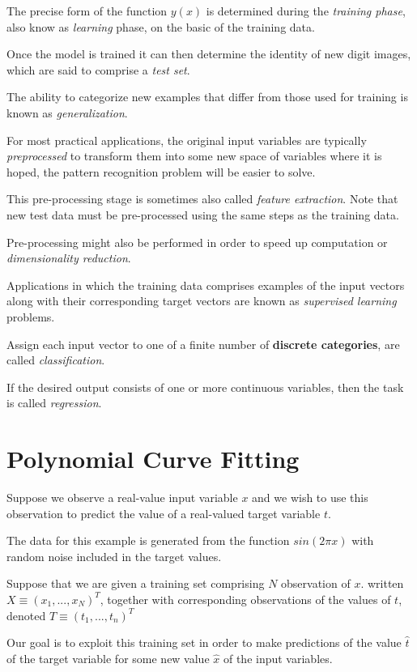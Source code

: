 The precise form of the function $y(x)$ is determined during the \textit{training phase}, also know as \textit{learning} phase, on the basic of the training data.

Once the model is trained it can then determine the identity of new digit images, which are said to comprise a \textit{test set}.

The ability to categorize new examples that differ from those used for training is known as \textit{generalization}.

For most practical applications, the original input variables are typically \textit{preprocessed} to transform them into some new space of variables where it is hoped, the pattern recognition problem will be easier to solve.

This pre-processing stage is sometimes also called \textit{feature extraction}. Note that new test data must be pre-processed using the same steps as the training data.

Pre-processing might also be performed in order to speed up computation or \textit{dimensionality reduction}.

Applications in which the training data comprises examples of the input vectors along with their corresponding target vectors are known as \textit{supervised learning} problems.

Assign each input vector to one of a finite number of \textbf{discrete categories}, are called \textit{classification}.

If the desired output consists of one or more continuous variables, then the task is called \textit{regression}.

\section{Polynomial Curve Fitting}

Suppose we observe a real-value input variable $x$ and we wish to use this observation to predict the value of a real-valued target variable $t$.

The data for this example is generated from the function $sin(2 \pi x)$ with random noise included in the target values.

Suppose that we are given a training set comprising $N$ observation of $x$. written $X \equiv (x_1, ..., x_N)^T$, together with corresponding observations of the values of $t$, denoted $T \equiv (t_1, ..., t_n)^T$

Our goal is to exploit this training set in order to make predictions of the value $\hat{t}$ of the target variable for some new value $\hat{x}$ of the input variables.

